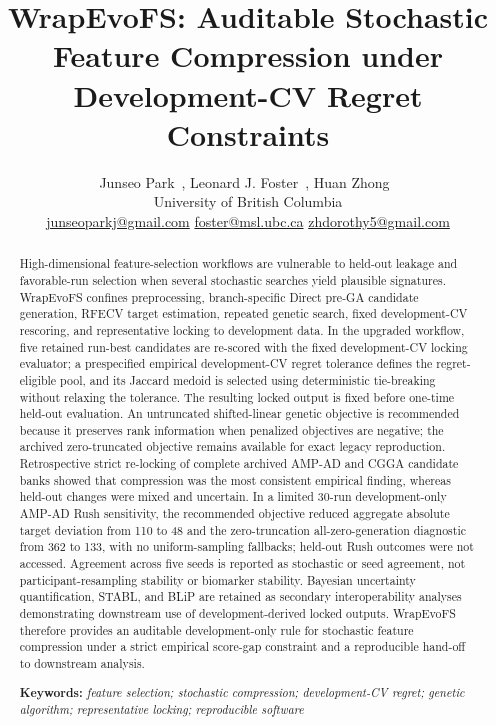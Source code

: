 \documentclass[10pt,letterpaper]{article}
\title{\LARGE\bfseries WrapEvoFS: Auditable Stochastic Feature Compression under Development-CV Regret Constraints}
\author{%
  \normalsize Junseo Park~\orcidlink{0009-0002-4385-6987}, Leonard J. Foster~\orcidlink{0000-0001-8551-4817}, Huan Zhong~\orcidlink{0000-0002-7294-2254}\\[0.25em]
  \small University of British Columbia\\[0.2em]
  \footnotesize
  \href{mailto:junseoparkj@gmail.com}{junseoparkj@gmail.com}\quad
  \href{mailto:foster@msl.ubc.ca}{foster@msl.ubc.ca}\quad
  \href{mailto:zhdorothy5@gmail.com}{zhdorothy5@gmail.com}%
}
\date{}
\newcounter{algorithm}
\newcommand{\keywords}[1]{\par\smallskip\noindent\textbf{Keywords:} \textit{#1}}
\begin{document}
\maketitle
\modulolinenumbers[1]
\linenumbers

\begin{abstract}
High-dimensional feature-selection workflows are vulnerable to held-out leakage and favorable-run selection when several stochastic searches yield plausible signatures. WrapEvoFS confines preprocessing, branch-specific Direct pre-GA candidate generation, RFECV target estimation, repeated genetic search, fixed development-CV rescoring, and representative locking to development data. In the upgraded workflow, five retained run-best candidates are re-scored with the fixed development-CV locking evaluator; a prespecified empirical development-CV regret tolerance defines the regret-eligible pool, and its Jaccard medoid is selected using deterministic tie-breaking without relaxing the tolerance. The resulting locked output is fixed before one-time held-out evaluation. An untruncated shifted-linear genetic objective is recommended because it preserves rank information when penalized objectives are negative; the archived zero-truncated objective remains available for exact legacy reproduction. Retrospective strict re-locking of complete archived AMP-AD and CGGA candidate banks showed that compression was the most consistent empirical finding, whereas held-out changes were mixed and uncertain. In a limited 30-run development-only AMP-AD Rush sensitivity, the recommended objective reduced aggregate absolute target deviation from 110 to 48 and the zero-truncation all-zero-generation diagnostic from 362 to 133, with no uniform-sampling fallbacks; held-out Rush outcomes were not accessed. Agreement across five seeds is reported as stochastic or seed agreement, not participant-resampling stability or biomarker stability. Bayesian uncertainty quantification, STABL, and BLiP are retained as secondary interoperability analyses demonstrating downstream use of development-derived locked outputs. WrapEvoFS therefore provides an auditable development-only rule for stochastic feature compression under a strict empirical score-gap constraint and a reproducible hand-off to downstream analysis.
\keywords{feature selection; stochastic compression; development-CV regret; genetic algorithm; representative locking; reproducible software}
\end{abstract}



\FloatBarrier




\end{document}

